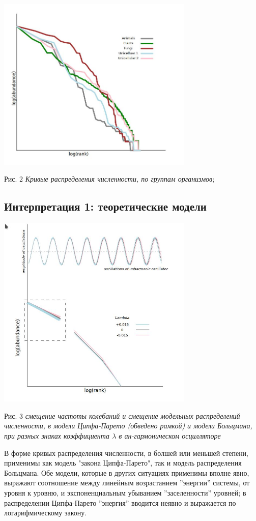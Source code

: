 \documentclass[a4paper]{article}
\begin{document}
\includegraphics[width=0.7\textwidth]{rankabundance.jpg}

Рис. 2 \textit{Кривые распределения численности, по группам организмов}; 

\subsection*{Интерпретация 1: теоретические модели}

\includegraphics[width=0.7\textwidth]{rankabundance_unharmonic.jpg}

Рис. 3 \textit{смещение частоты колебаний и смещение модельных распределений численности, в модели Ципфа-Парето (обведено рамкой) и модели Больцмана, при разных знаках коэффициента $\lambda$ в ан-гармоническом осцилляторе}

В форме кривых распределения численности, в болшей или меньшей степени, применимы как модель "закона Ципфа-Парето", так и модель распределения Больцмана. Обе модели, которые в других ситуациях применимы вполне явно, выражают соотношение между линейным возрастанием ''энергии'' системы, от уровня к уровню, и экспоненциальным убыванием ''заселенности'' уровней; в распределении Ципфа-Парето ''энергия'' вводится неявно и выражается по логарифмическому закону. 
\end{document}
